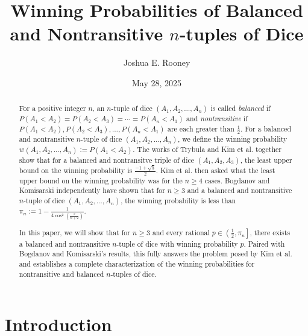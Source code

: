 \documentclass[11pt]{article}
\author{Joshua E. Rooney}
\date{May 28, 2025}
\title{Winning Probabilities of Balanced and Nontransitive $n$-tuples of Dice}
\theoremstyle{definition}
\begin{document}
\maketitle

\begin{abstract}
    For a positive integer $n$, an $n$-tuple of dice $(A_1,A_2,\dots,A_n)$ is called \emph{balanced} if $P(A_1<A_2) = P(A_2<A_3) = \cdots = P(A_n<A_1)$ and \emph{nontransitive} if $P(A_1<A_2), P(A_2<A_3), \dots, P(A_n<A_1)$ are each greater than $\frac{1}{2}$. For a balanced and nontransitive $n$-tuple of dice $(A_1,A_2,\dots,A_n)$, we define the winning probability $w(A_1,A_2,\dots,A_n) := P(A_1 < A_2)$. The works of Trybula and Kim et al. together show that for a balanced and nontransitve triple of dice $(A_1,A_2,A_3)$, the least upper bound on the winning probability is $\frac{-1+\sqrt{5}}{2}$. Kim et al. then asked what the least upper bound on the winning probability was for the $n \geq 4$ cases. Bogdanov and Komisarski independently have shown that for $n\geq 3$ and a balanced and nontransitive $n$-tuple of dice $(A_1,A_2,\dots,A_n)$, the winning probability is less than $\pi_n := 1-\frac{1}{4\cos^2\left( \frac{\pi}{n+2} \right)}$.
    
    In this paper, we will show that for $n \geq 3$ and every rational $p \in  \left( \frac{1}{2}, \pi_n \right]$, there exists a balanced and nontransitive $n$-tuple of dice with winning probability $p$. Paired with Bogdanov and Komisarski's results, this fully answers the problem posed by Kim et al. and establishes a complete characterization of the winning probabilities for nontransitive and balanced $n$-tuples of dice.
\end{abstract}

\section{Introduction}
\end{document}
